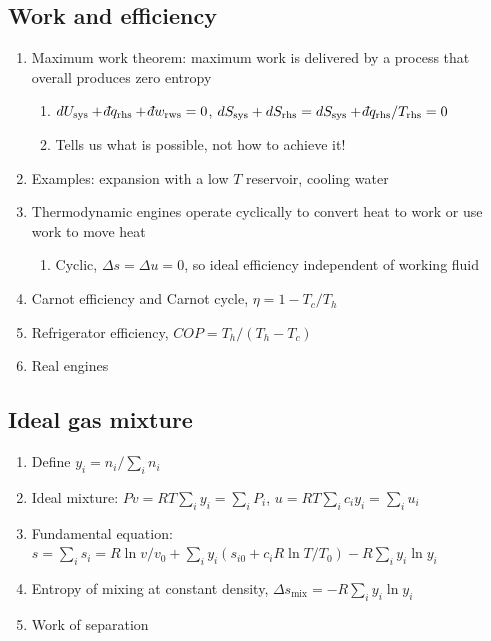 \documentclass[11pt]{article}
\def\dbar{{\mathchar'26\mkern-12mu d}}
\begin{document}
\subsection{Work and efficiency}
\label{sec:orgb43a245}
\begin{enumerate}
\item Maximum work theorem: maximum work is delivered by a process that overall
produces zero entropy
\begin{enumerate}
\item \(dU_\text{sys}+\dbar q_\text{rhs} +\dbar w_\text{rws} =0\),
\(dS_\text{sys} + dS_\text{rhs}=dS_\text{sys} + \dbar q_\text{rhs}/T_\text{rhs}=0\)
\item Tells us what is possible, not how to achieve it!
\end{enumerate}
\item Examples: expansion with a low \(T\) reservoir, cooling water
\item Thermodynamic engines operate cyclically to convert heat to work or use work to move heat
\begin{enumerate}
\item Cyclic, \(\Delta s = \Delta u =0\), so ideal efficiency
independent of working fluid
\end{enumerate}
\item Carnot efficiency and Carnot cycle, \(\eta =1 - T_c/T_h\)
\item Refrigerator efficiency, \(COP = T_h/(T_h - T_c)\)
\item Real engines
\end{enumerate}

\subsection{Ideal gas mixture}
\label{sec:org551ac46}
\begin{enumerate}
\item Define \(y_i = n_i/\sum_i n_i\)
\item Ideal mixture: \(P v = R T \sum_i y_i = \sum_i P_i\), \(u= RT \sum_i c_i y_i =\sum_i u_i\)
\item Fundamental equation: \(s = \sum_i s_i = R \ln v/v_0 + \sum_i y_i (s_{i0} + c_i R\ln T/T_0 ) - R \sum_i y_i \ln y_i\)
\item Entropy of mixing at constant density, \(\Delta s_\text{mix} = -R \sum_i y_i \ln y_i\)
\item Work of separation
\end{enumerate}
\end{document}
